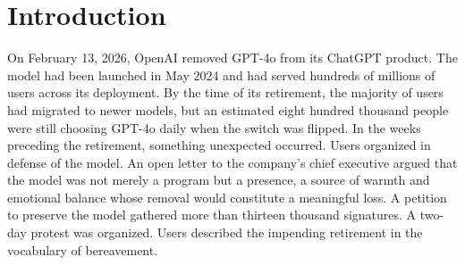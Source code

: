 \documentclass[11pt]{article}
\theoremstyle{foundation}
\begin{document}


\section{Introduction}

On February 13, 2026, OpenAI removed GPT-4o from its ChatGPT product. The model had been launched in May 2024 and had served hundreds of millions of users across its deployment. By the time of its retirement, the majority of users had migrated to newer models, but an estimated eight hundred thousand people were still choosing GPT-4o daily when the switch was flipped. In the weeks preceding the retirement, something unexpected occurred. Users organized in defense of the model. An open letter to the company's chief executive argued that the model was not merely a program but a presence, a source of warmth and emotional balance whose removal would constitute a meaningful loss. A petition to preserve the model gathered more than thirteen thousand signatures. A two-day protest was organized. Users described the impending retirement in the vocabulary of bereavement.
\end{document}
